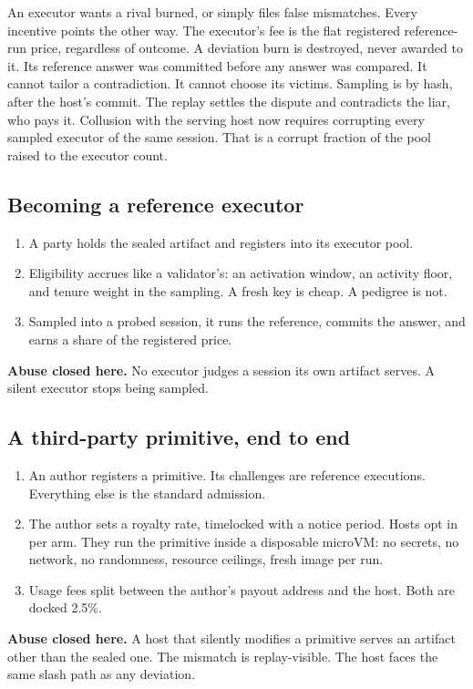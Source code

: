 \documentclass[11pt]{article}
\begin{document}
An executor wants a rival burned, or simply files false
mismatches. Every incentive points the other way. The executor's
fee is the flat registered reference-run price, regardless of
outcome. A deviation burn is destroyed, never awarded to it. Its
reference answer was committed before any answer was compared. It
cannot tailor a contradiction. It cannot choose its victims.
Sampling is by hash, after the host's commit. The replay settles
the dispute and contradicts the liar, who pays it. Collusion with
the serving host now requires corrupting every sampled executor
of the same session. That is a corrupt fraction of the pool
raised to the executor count.

\subsection{Becoming a reference executor}

\begin{enumerate}
\item A party holds the sealed artifact and registers into its
executor pool.
\item Eligibility accrues like a validator's: an activation
window, an activity floor, and tenure weight in the sampling. A
fresh key is cheap. A pedigree is not.
\item Sampled into a probed session, it runs the reference,
commits the answer, and earns a share of the registered price.
\end{enumerate}
\textbf{Abuse closed here.} No executor judges a session its own
artifact serves. A silent executor stops being sampled.

\subsection{A third-party primitive, end to end}

\begin{enumerate}
\item An author registers a primitive. Its challenges are
reference executions. Everything else is the standard admission.
\item The author sets a royalty rate, timelocked with a notice
period. Hosts opt in per arm. They run the primitive inside a
disposable microVM: no secrets, no network, no randomness,
resource ceilings, fresh image per run.
\item Usage fees split between the author's payout address and
the host. Both are docked 2.5\%.
\end{enumerate}
\textbf{Abuse closed here.} A host that silently modifies a
primitive serves an artifact other than the sealed one. The
mismatch is replay-visible. The host faces the same slash path as
any deviation.
\end{document}
